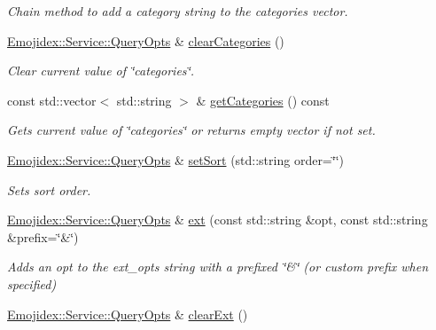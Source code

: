 \begin{DoxyCompactItemize}
\begin{DoxyCompactList}\small\item\em Chain method to add a category string to the categories vector. \end{DoxyCompactList}\item 
\hyperlink{classEmojidex_1_1Service_1_1QueryOpts}{Emojidex\+::\+Service\+::\+Query\+Opts} \& \hyperlink{classEmojidex_1_1Service_1_1QueryOpts_ad319ea44268d12872d7440697f86477a}{clear\+Categories} ()\hypertarget{classEmojidex_1_1Service_1_1QueryOpts_ad319ea44268d12872d7440697f86477a}{}\label{classEmojidex_1_1Service_1_1QueryOpts_ad319ea44268d12872d7440697f86477a}

\begin{DoxyCompactList}\small\item\em Clear current value of \char`\"{}categories\char`\"{}. \end{DoxyCompactList}\item 
const std\+::vector$<$ std\+::string $>$ \& \hyperlink{classEmojidex_1_1Service_1_1QueryOpts_a70793f0fdaf87d80eb5343c45a58367e}{get\+Categories} () const 
\begin{DoxyCompactList}\small\item\em Gets current value of \char`\"{}categories\char`\"{} or returns empty vector if not set. \end{DoxyCompactList}\item 
\hyperlink{classEmojidex_1_1Service_1_1QueryOpts}{Emojidex\+::\+Service\+::\+Query\+Opts} \& \hyperlink{classEmojidex_1_1Service_1_1QueryOpts_a5a187d4a45d838387f99196a70458173}{set\+Sort} (std\+::string order=\char`\"{}\char`\"{})\hypertarget{classEmojidex_1_1Service_1_1QueryOpts_a5a187d4a45d838387f99196a70458173}{}\label{classEmojidex_1_1Service_1_1QueryOpts_a5a187d4a45d838387f99196a70458173}

\begin{DoxyCompactList}\small\item\em Sets sort order. \end{DoxyCompactList}\item 
\hyperlink{classEmojidex_1_1Service_1_1QueryOpts}{Emojidex\+::\+Service\+::\+Query\+Opts} \& \hyperlink{classEmojidex_1_1Service_1_1QueryOpts_abc3b57ad07108e262eda4505cfdcc5c8}{ext} (const std\+::string \&opt, const std\+::string \&prefix=\char`\"{}\&\char`\"{})\hypertarget{classEmojidex_1_1Service_1_1QueryOpts_abc3b57ad07108e262eda4505cfdcc5c8}{}\label{classEmojidex_1_1Service_1_1QueryOpts_abc3b57ad07108e262eda4505cfdcc5c8}

\begin{DoxyCompactList}\small\item\em Adds an opt to the ext\+\_\+opts string with a prefixed \char`\"{}\&\char`\"{} (or custom prefix when specified) \end{DoxyCompactList}\item 
\hyperlink{classEmojidex_1_1Service_1_1QueryOpts}{Emojidex\+::\+Service\+::\+Query\+Opts} \& \hyperlink{classEmojidex_1_1Service_1_1QueryOpts_ae0455c295169a616efbbd5b3721c998f}{clear\+Ext} ()\hypertarget{classEmojidex_1_1Service_1_1QueryOpts_ae0455c295169a616efbbd5b3721c998f}{}\label{classEmojidex_1_1Service_1_1QueryOpts_ae0455c295169a616efbbd5b3721c998f}


\end{DoxyCompactItemize}
